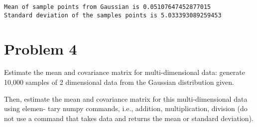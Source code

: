 \documentclass[11pt]{article}
\begin{document}
    \begin{Verbatim}[commandchars=\\\{\}]
Mean of sample points from Gaussian is 0.05107647452877015 
Standard deviation of the samples points is 5.033393089259453

    \end{Verbatim}

    \section{Problem 4}\label{problem-4}

Estimate the mean and covariance matrix for multi-dimensional data:
generate 10,000 samples of 2 dimensional data from the Gaussian
distribution given.

Then, estimate the mean and covariance matrix for this multi-dimensional
data using elemen- tary numpy commands, i.e., addition, multiplication,
division (do not use a command that takes data and returns the mean or
standard deviation).
\end{document}
